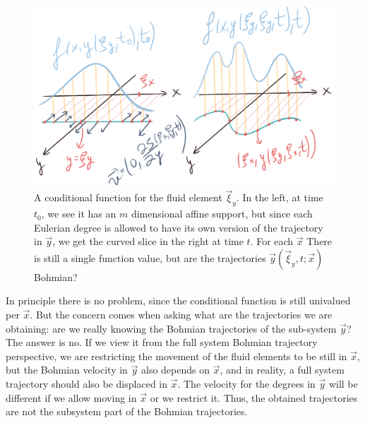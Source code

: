 \documentclass[11pt, a4paper]{article} %
\DeclareRobustCommand{\mybox}[2][gray!10]{%
\begin{tcolorbox}[   %
        left=0.2cm,
        right=0.2cm,
        top=0.15cm,
        bottom=0.15cm,
        colback=#1,
        colframe=#1,
        width=\dimexpr\textwidth\relax, 
        enlarge left by=0mm,
        boxsep=5pt,
        arc=0pt,outer arc=0pt,
        ]
        #2
\end{tcolorbox}
}
\begin{document}
\begin{figure}[h!]
  \centering
    \includegraphics[width=0.65\linewidth]{unstructure_aligned.png}
  \caption{A conditional function for the fluid element $\vec{\xi}_y$. In the left, at time $t_0$, we see it has an $m$ dimensional affine support, but since each Eulerian degree is allowed to have its own version of the trajectory in $\vec{y}$, we get the curved slice in the right at time $t$. For each $\vec{x}$ There is still a single function value, but are the trajectories $\vec{y}(\vec{\xi}_y,t;\vec{x})$ Bohmian? %
  }
  \label{fig:only_y}
\end{figure}
\mybox{
In principle there is no problem, since the conditional function is still univalued per $\vec{x}$. But the concern comes when asking what are the trajectories we are obtaining: are we really knowing the Bohmian trajectories of the sub-system $\vec{y}$? The answer is no. If we view it from the full system Bohmian trajectory perspective, we are restricting the movement of the fluid elements to be still in $\vec{x}$, but the Bohmian velocity in $\vec{y}$ also depends on $\vec{x}$, and in reality, a full system trajectory should also be displaced in $\vec{x}$. The velocity for the degrees in $\vec{y}$ will be different if we allow moving in $\vec{x}$ or we restrict it. Thus, the obtained trajectories are not the subsystem part of the Bohmian trajectories.}%
\end{document}
